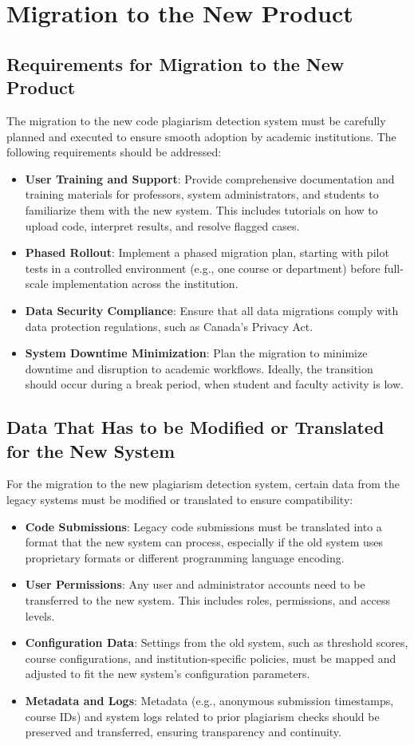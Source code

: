 \documentclass[12pt]{article}
\begin{document}
\section{Migration to the New Product}
\subsection{Requirements for Migration to the New Product}
The migration to the new code plagiarism detection system must be carefully planned and executed to ensure smooth adoption by academic institutions. The following requirements should be addressed:
\begin{itemize}
    \item \textbf{User Training and Support}: Provide comprehensive documentation and training materials for professors, system administrators, and students to familiarize them with the new system. This includes tutorials on how to upload code, interpret results, and resolve flagged cases.
    \item \textbf{Phased Rollout}: Implement a phased migration plan, starting with pilot tests in a controlled environment (e.g., one course or department) before full-scale implementation across the institution.
    \item \textbf{Data Security Compliance}: Ensure that all data migrations comply with data protection regulations, such as Canada's Privacy Act.
    \item \textbf{System Downtime Minimization}: Plan the migration to minimize downtime and disruption to academic workflows. Ideally, the transition should occur during a break period, when student and faculty activity is low.
\end{itemize}
\subsection{Data That Has to be Modified or Translated for the New System}
For the migration to the new plagiarism detection system, certain data from the legacy systems must be modified or translated to ensure compatibility:
\begin{itemize}
    \item \textbf{Code Submissions}: Legacy code submissions must be translated into a format that the new system can process, especially if the old system uses proprietary formats or different programming language encoding.
    \item \textbf{User Permissions}: Any user and administrator accounts need to be transferred to the new system. This includes roles, permissions, and access levels.
    \item \textbf{Configuration Data}: Settings from the old system, such as threshold scores, course configurations, and institution-specific policies, must be mapped and adjusted to fit the new system’s configuration parameters.
    \item \textbf{Metadata and Logs}: Metadata (e.g., anonymous submission timestamps, course IDs) and system logs related to prior plagiarism checks should be preserved and transferred, ensuring transparency and continuity.
\end{itemize}
\end{document}
